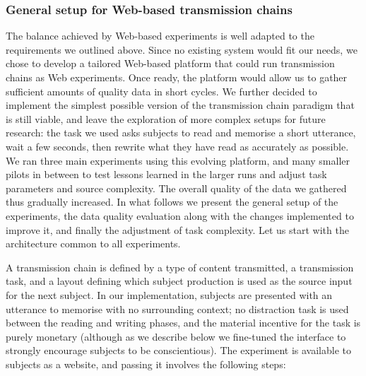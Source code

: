 \subsubsection{General setup for Web-based transmission
chains}\label{general-setup-for-web-based-transmission-chains}

The balance achieved by Web-based experiments is well adapted to the
requirements we outlined above. Since no existing system would fit our
needs, we chose to develop a tailored Web-based platform that could run
transmission chains as Web experiments. Once ready, the platform would
allow us to gather sufficient amounts of quality data in short cycles.
We further decided to implement the simplest possible version of the
transmission chain paradigm that is still viable, and leave the
exploration of more complex setups for future research: the task we used
asks subjects to read and memorise a short utterance, wait a few
seconds, then rewrite what they have read as accurately as possible. We
ran three main experiments using this evolving platform, and many
smaller pilots in between to test lessons learned in the larger runs and
adjust task parameters and source complexity. The overall quality of the
data we gathered thus gradually increased. In what follows we present
the general setup of the experiments, the data quality evaluation along
with the changes implemented to improve it, and finally the adjustment
of task complexity. Let us start with the architecture common to all
experiments.

A transmission chain is defined by a type of content transmitted, a
transmission task, and a layout defining which subject production is
used as the source input for the next subject. In our implementation,
subjects are presented with an utterance to memorise with no surrounding
context; no distraction task is used between the reading and writing
phases, and the material incentive for the task is purely monetary
(although as we describe below we fine-tuned the interface to strongly
encourage subjects to be conscientious). The experiment is available to
subjects as a website, and passing it involves the following steps:

